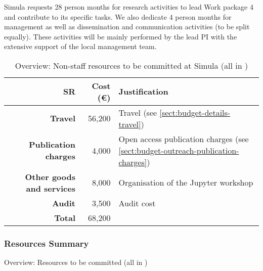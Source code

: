 Simula requests 28 person months for research activities to lead Work package 4 and contribute to its specific tasks. 
We also dedicate 4 person months for management  as well as  dissemination and communication activities (to be split equally). These activities will be mainly performed by the lead PI with the extensive support of the local management team.  
\bigskip
\begin{table}[H]
\begin{tabular}{|r|r|p{8.5cm}|}
\hline
\textbf{SR} & \textbf{Cost (\euro)} & \textbf{Justification} \\\hline
\textbf{Travel} & 56,200 & Travel (see \ref{sect:budget-details-travel})\\\hline
\textbf{Publication charges} & 4,000 & Open access publication charges (see \ref{sect:budget-outreach-publication-charges})\\\hline

\textbf{Other goods and services} & 8,000 & Organisation of the Jupyter workshop  \\\hline   %
\textbf{Audit} & 3,500 & Audit cost \\\hline
\textbf{Total} & 68,200\\\cline{1-2}
\end{tabular}
\caption{Overview: Non-staff resources to be committed at Simula (all in \texteuro)}\vspace*{-1em}
\end{table}

\subsubsection{Resources Summary}

\begin{table}[ht]\centering
\caption{Overview: Resources to be committed (all in \texteuro)}\label{tab:resources}\vspace*{-1em}
\end{table}


